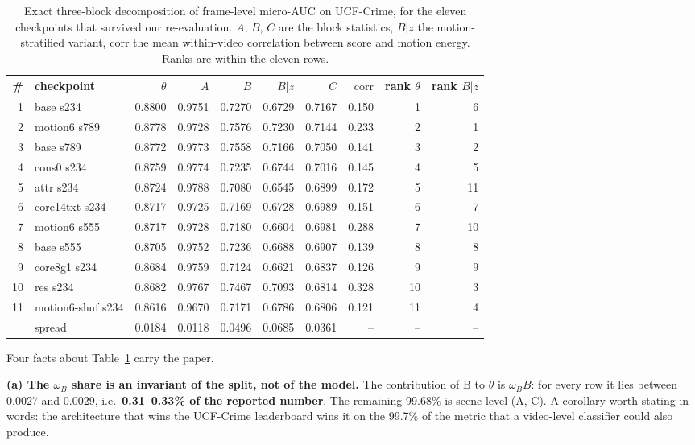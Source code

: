 \documentclass[number,preprint,12pt]{elsarticle}
\begin{document}
\begin{table}[t]
\centering
\caption{Exact three-block decomposition of frame-level micro-AUC on
UCF-Crime, for the eleven checkpoints that survived our re-evaluation.  $A$,
$B$, $C$ are the block statistics, $B|z$ the motion-stratified variant,
$\mathrm{corr}$ the mean within-video correlation between score and motion energy.
Ranks are within the eleven rows.}
\label{tab:decomp-ucf}
\footnotesize
\begin{tabular}{@{}rlrrrrrrrr@{}}
\toprule
\# & checkpoint & $\theta$ & $A$ & $B$ & $B|z$ & $C$ & $\mathrm{corr}$ & rank $\theta$ & rank $B|z$ \\
\midrule
1  & base s234        & 0.8800 & 0.9751 & 0.7270 & 0.6729 & 0.7167 & 0.150 & 1  & 6  \\
2  & motion6 s789     & 0.8778 & 0.9728 & 0.7576 & 0.7230 & 0.7144 & 0.233 & 2  & 1  \\
3  & base s789        & 0.8772 & 0.9773 & 0.7558 & 0.7166 & 0.7050 & 0.141 & 3  & 2  \\
4  & cons0 s234       & 0.8759 & 0.9774 & 0.7235 & 0.6744 & 0.7016 & 0.145 & 4  & 5  \\
5  & attr s234        & 0.8724 & 0.9788 & 0.7080 & 0.6545 & 0.6899 & 0.172 & 5  & 11 \\
6  & core14txt s234   & 0.8717 & 0.9725 & 0.7169 & 0.6728 & 0.6989 & 0.151 & 6  & 7  \\
7  & motion6 s555     & 0.8717 & 0.9728 & 0.7180 & 0.6604 & 0.6981 & 0.288 & 7  & 10 \\
8  & base s555        & 0.8705 & 0.9752 & 0.7236 & 0.6688 & 0.6907 & 0.139 & 8  & 8  \\
9  & core8g1 s234     & 0.8684 & 0.9759 & 0.7124 & 0.6621 & 0.6837 & 0.126 & 9  & 9  \\
10 & res s234         & 0.8682 & 0.9767 & 0.7467 & 0.7093 & 0.6814 & 0.328 & 10 & 3  \\
11 & motion6-shuf s234 & 0.8616 & 0.9670 & 0.7171 & 0.6786 & 0.6806 & 0.121 & 11 & 4  \\
\midrule
   & spread           & 0.0184 & 0.0118 & 0.0496 & 0.0685 & 0.0361 & --    & -- & -- \\
\bottomrule
\end{tabular}
\end{table}

Four facts about Table~\ref{tab:decomp-ucf} carry the paper.

\textbf{(a) The \(\omega_B\) share is an invariant of the split, not of the model.} The
contribution of B to \(\theta\) is \(\omega_B B\): for every row it lies between 0.0027 and
0.0029, i.e.~\textbf{0.31--0.33\% of the reported number}. The remaining 99.68\% is
scene-level (A, C). A corollary worth stating in words: the architecture that
wins the UCF-Crime leaderboard wins it on the 99.7\% of the metric that a
video-level classifier could also produce.
\end{document}
